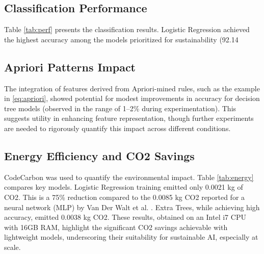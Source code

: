 \documentclass[conference]{IEEEtran}
\begin{document}
\subsection{Classification Performance}
Table \ref{tab:perf} presents the classification results. Logistic Regression achieved the highest accuracy among the models prioritized for sustainability (92.14%

\subsection{Apriori Patterns Impact}
The integration of features derived from Apriori-mined rules, such as the example in \eqref{eq:apriori}, showed potential for modest improvements in accuracy for decision tree models (observed in the range of 1--2\% during experimentation). This suggests utility in enhancing feature representation, though further experiments are needed to rigorously quantify this impact across different conditions.

\subsection{Energy Efficiency and CO2 Savings}
CodeCarbon \cite{b13} was used to quantify the environmental impact. Table \ref{tab:energy} compares key models. Logistic Regression training emitted only 0.0021 kg of CO2. This is a 75\% reduction compared to the 0.0085 kg CO2 reported for a neural network (MLP) by Van Der Walt et al. \cite{b6}. Extra Trees, while achieving high accuracy, emitted 0.0038 kg CO2. These results, obtained on an Intel i7 CPU with 16GB RAM, highlight the significant CO2 savings achievable with lightweight models, underscoring their suitability for sustainable AI, especially at scale.
\end{document}

